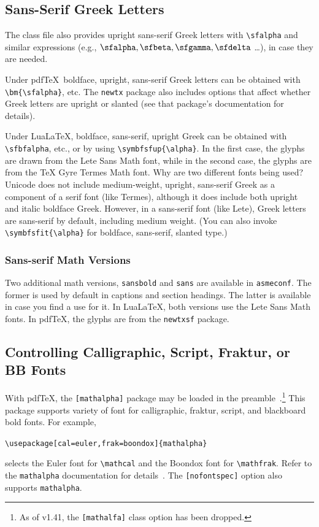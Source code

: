 \documentclass[colorlinks,upint,subscriptcorrection,varvw,balance,loadscripts,german,vietamese]{asmeconf} %
\newcommand*\pdfTeX{pdf\TeX}
\newcommand*\LuaLaTeX{Lua\LaTeX}
\begin{document}
\subsection{Sans-Serif Greek Letters}
The class file also provides upright sans-serif Greek letters with \verb|\sfalpha| and similar expressions (e.g., $\sfalpha, \sfbeta, \sfgamma, \sfdelta$ \ldots ), in case they are needed. 

Under \pdfTeX\  boldface, upright, sans-serif Greek letters can be obtained with \verb|\bm{\sfalpha}|, etc.  The \texttt{newtx} package also includes options that affect whether Greek letters are upright or slanted (see that package's documentation for details).

Under \LuaLaTeX, boldface, sans-serif, upright Greek can be obtained with \verb|\sfbfalpha|, etc., or by using \verb|\symbfsfup{\alpha}|.  In the first case, the glyphs are drawn from the Lete Sans Math font, while in the second case, the glyphs are from the TeX Gyre Termes Math font.   Why are two different fonts being used? Unicode does not include medium-weight, upright, sans-serif Greek as a component of a serif font (like Termes), although it does include both upright and italic boldface Greek. However, in a sans-serif font (like Lete), Greek letters are sans-serif by default, including medium weight. (You can also invoke \verb|\symbfsfit{\alpha}| for  boldface, sans-serif, slanted type.) 

\subsubsection*{Sans-serif Math Versions} Two additional math versions, \texttt{sansbold} and \texttt{sans} are available in \texttt{asmeconf}.  The former is used by default in captions and section headings.  The latter is available in case you find a use for it. In \LuaLaTeX, both versions use the Lete Sans Math fonts. In \pdfTeX, the glyphs are from the \texttt{newtxsf} package.
  
  
\subsection{Controlling Calligraphic, Script, Fraktur, or BB Fonts}
With \pdfTeX, the \texttt{[mathalpha]} package may be loaded in the preamble~\cite{sharpe2}.\footnote{As of v1.41, the \texttt{[mathalfa]} class option has been dropped.} This package supports variety of font for calligraphic, fraktur, script, and blackboard bold fonts. For example,
\begin{center}
\verb|\usepackage[cal=euler,frak=boondox]{mathalpha}| 
\end{center}
selects the Euler font for \verb|\mathcal| and the Boondox font for \verb|\mathfrak|. Refer to the \texttt{mathalpha} documentation for details~\cite{sharpe2}.  The \texttt{[nofontspec]} option also supports \texttt{mathalpha}.
\end{document}
